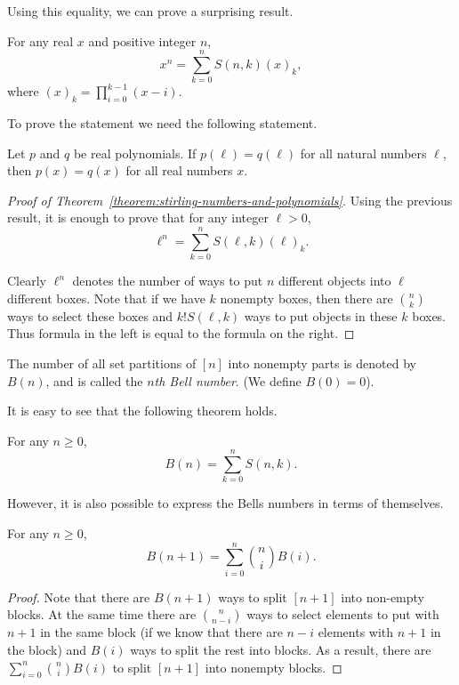 Using this equality, we can prove a surprising result.
\begin{theorem}
\label{theorem:stirling-numbers-and-polynomials}
  For any real $x$ and positive integer $n$,
  \[
    x^n = \sum_{k = 0}^n S(n, k) (x)_k,
  \]
  where $(x)_k = \prod_{i = 0}^{k - 1} (x - i)$.
\end{theorem}

To prove the statement we need the following statement.
\begin{theorem}
  Let $p$ and $q$ be real polynomials. If $p(\ell) = q(\ell)$ for all
  natural numbers $\ell$, then $p(x) = q(x)$ for all real numbers $x$.
\end{theorem}

\begin{proof}[Proof of Theorem~\ref{theorem:stirling-numbers-and-polynomials}]
  Using the previous result, it is enough to prove that
  for any integer $\ell > 0$,
  \[
    \ell^n = \sum_{k = 0}^n S(\ell, k) (\ell)_k.
  \]

  Clearly $\ell^n$ denotes the number of ways to put $n$ different
  objects into $\ell$ different boxes. Note that if we have $k$ nonempty
  boxes, then there are $\binom{n}{k}$ ways to select these boxes and
  $k! S(\ell, k)$ ways to put objects in these $k$ boxes. Thus formula in
  the left is equal to the formula on the right.
\end{proof}

\begin{definition}
  The number of all set partitions of $[n]$ into nonempty parts
  is denoted by $B(n)$, and is called the \emph{$n$th Bell number}.
  (We define $B(0) = 0$).
\end{definition}


It is easy to see that the following theorem holds.
\begin{theorem}
  For any $n \ge 0$,
  \[
    B(n) = \sum_{k = 0}^n S(n, k).
  \]
\end{theorem}

However, it is also possible to express the Bells numbers in terms
of themselves.
\begin{theorem}
  For any $n \ge 0$,
  \[
    B(n + 1) = \sum_{i = 0}^n \binom{n}{i} B(i).
  \]
\end{theorem}
\begin{proof}
  Note that there are $B(n + 1)$ ways to split $[n + 1]$ into
  non-empty blocks. At the same time there are $\binom{n}{n - i}$
  ways to select elements to put with $n + 1$ in the same block
  (if we know that there are $n - i$ elements with $n + 1$ in the block)
  and $B(i)$ ways to split the rest into blocks. As a result,
  there are $\sum_{i = 0}^n \binom{n}{i} B(i)$ to split $[n + 1]$
  into nonempty blocks.
\end{proof}

